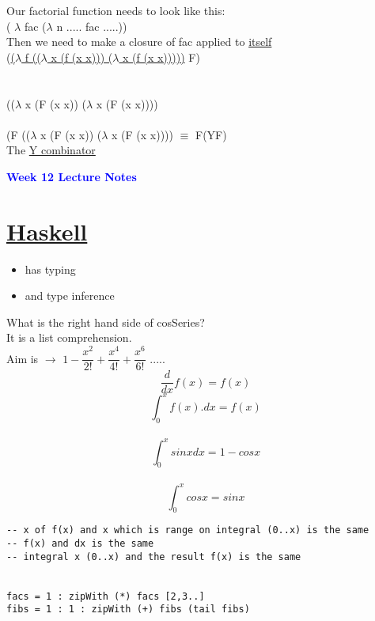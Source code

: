 \documentclass{article}
\newcommand\tab[1][1cm]{\hspace*{#1}}
\begin{document}
\begin{flushleft}
\begin{flushleft}
\begin{flushleft}
\vspace*{1cm}
Our factorial function needs to look like this: \\
( $\lambda$ fac ($\lambda$ n ..... fac .....))\\
\vspace*{1cm}
Then we need to make a closure of fac applied to \underline{itself}\\
\vspace*{0.4cm}
(\underline{($\lambda$ f (($\lambda$ x (f (x x))) ($\lambda$ x (f (x x)))))} F)\\
\textcolor{red}{\tab{y}}\\
\bigskip
{\LARGE \tab{$\downarrow$ $\beta$}}\\
\bigskip
(($\lambda$ x (F (x x)) ($\lambda$ x (F (x x))))\\
\bigskip
{\LARGE \tab{$\downarrow$ $\beta$}}\\
\bigskip
(F (($\lambda$ x (F (x x)) ($\lambda$ x (F (x x)))) $\equiv$ F(YF)\\
\vspace*{1.5cm}
The \underline{Y combinator}  
\pagebreak

\textcolor{blue}{\textbf{{\huge Week 12 Lecture Notes}}}
\section*{\underline {Haskell}}
\begin{flushleft}
\begin{itemize}
\item has typing
\item and type inference
\end{itemize}
\bigskip
What is the right hand side of cosSeries?\\
It is a list comprehension.\\
\bigskip
{\large Aim is} $\rightarrow$ $ 1 - \dfrac{x^{2}}{2!} + \dfrac{x^{4}}{4!} + \dfrac{x^{6}}{6!}$ .....\\
$$\dfrac{d}{dx}f(x) = f(x)$$
$$\int_{0}^{x} f(x).dx = f(x)$$ \\
$$\int_{0}^{x} sinx dx = 1 - cosx$$\\
$$\int_{0}^{x} cosx = sinx$$
\bigskip
\begin{verbatim}
-- x of f(x) and x which is range on integral (0..x) is the same 
-- f(x) and dx is the same
-- integral x (0..x) and the result f(x) is the same


facs = 1 : zipWith (*) facs [2,3..]
fibs = 1 : 1 : zipWith (+) fibs (tail fibs)
\end{verbatim}
\end{flushleft}
\pagebreak

\end{flushleft}
\end{flushleft}
\end{flushleft}
\end{document}
